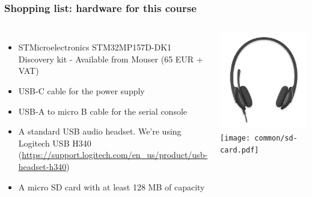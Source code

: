 \begin{frame}
\frametitle{Shopping list: hardware for this course}
  \begin{columns}
    \footnotesize
    \begin{itemize}
      \item STMicroelectronics STM32MP157D-DK1 Discovery kit -
        Available from Mouser (65 EUR + VAT)
      \item USB-C cable for the power supply
      \item USB-A to micro B cable for the serial console
      \item A standard USB audio headset. We're using Logitech USB H340
	    (\url{https://support.logitech.com/en_us/product/usb-headset-h340})
      \item A micro SD card with at least 128 MB of capacity
    \end{itemize}
    \includegraphics[height=0.15\textheight]{common/logitech-h340.png} \\
    \vspace{1cm}
    \texttt{[image: common/sd-card.pdf]}
  \end{columns}
\end{frame}
